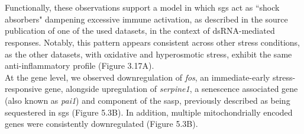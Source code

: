 \\
\\
Functionally, these observations support a model in which \glspl{sg} act as ``shock absorbers" dampening excessive immune activation, as described in the source publication of one of the used datasets, in the context of dsRNA-mediated responses\cite{paget_stress_2023}. Notably, this pattern appears consistent across other stress conditions, as the other datasets\cite{matheny_transcriptome-wide_2019, matheny_rna_2021, matheny_corrigendum_2023}, with oxidative and hyperosmotic stress, exhibit the same anti-inflammatory profile (Figure 3.17A).
\\
At the gene level, we observed downregulation of \textit{\gls{fos}}, an immediate-early stress-responsive gene\cite{zhou_role_2007}, alongside upregulation of \textit{\gls{serpine1}}, a senescence associated gene (also known as \textit{\gls{pai1}}) and component of the \gls{sasp}\cite{omer_stress_2018}, previously described as being sequestered in \gls{sg}s\cite{omer_stress_2018} (Figure 5.3B). In addition, multiple mitochondrially encoded genes were consistently downregulated (Figure 5.3B).


